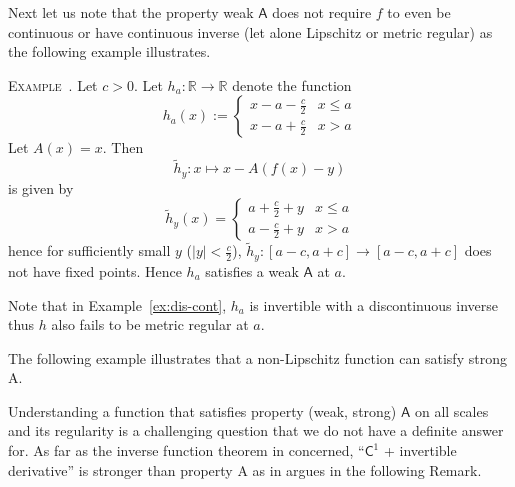\documentclass[a4, 12pt,leqno]{amsart}
\newcounter{example}
\newenvironment{example}[1]{\refstepcounter{example}\par\medskip
	\noindent \textsc{\small Example~\theexample. #1} \rmfamily\hspace{-2pt}}{\medskip}
\theoremstyle{plain}
\theoremstyle{definition}
\theoremstyle{remark}
\numberwithin{equation}{section}
\newcommand{\R}{\mathbb R}
\begin{document}
\par Next let us note that the property weak $\textsf{A}$ does not require $f$ to even be continuous or have continuous inverse (let alone Lipschitz or metric regular) as the following example illustrates.
\begin{example}\phantom{}\hspace{-8pt} Let $c>0$. Let $h_{a}:\R \to \R$ denote the function
	\[
	h_{a}(x) := \begin{cases}  
		x-a - \frac{c}{2} & x \le a\\
		x-a + \frac{c}{2} & x > a 
		\end{cases}
	\] 
Let $A(x) = x$. Then
\[
\tilde{h}_y: x \mapsto x - A(f(x) - y)
\] 
is given by
\[
\tilde{h}_y(x) = \begin{cases} 
	a+\frac{c}{2}+y   & x \le a\\
	a-\frac{c}{2} + y & x > a
	\end{cases}
\]
hence for sufficiently small $y$ ($|y|< \frac{c}{2}$), $\tilde{h}_y: [a-c,a+c] \to [a-c,a+c]$ does not have fixed points. Hence $h_a$ satisfies a weak $\textsf{A}$ at $a$.
\label{ex:dis-cont} 
\end{example} 

Note that in Example~\ref{ex:dis-cont}, $h_a$ is invertible with a discontinuous inverse thus $h$ also fails to be metric regular at $a$. 



The following example illustrates that a non-Lipschitz function can satisfy strong $\text{A}$. 


\par Understanding a function that satisfies property (weak, strong) $\textsf{A}$ on all scales and its regularity is a challenging question that we do not have a definite answer for. As far as the inverse function theorem in concerned, ``$\mathsf{C}^1$ + invertible derivative'' is stronger than property $\text{A}$ as in argues in the following Remark.
\end{document}
